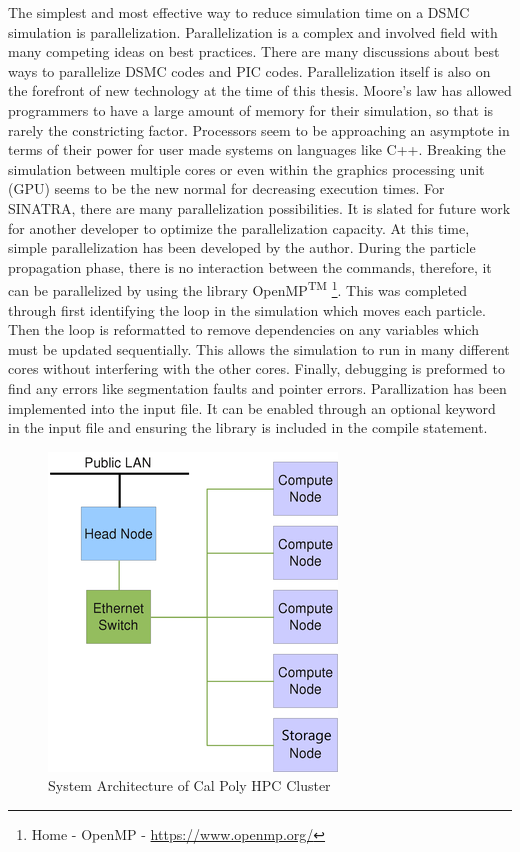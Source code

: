 \indent The simplest and most effective way to reduce simulation time on a DSMC simulation is parallelization. Parallelization is a complex and involved field with many competing ideas on best practices. There are many discussions about best ways to parallelize DSMC codes and PIC codes. Parallelization itself is also on the forefront of new technology at the time of this thesis. Moore's law has allowed programmers to have a large amount of memory for their simulation, so that is rarely the constricting factor. Processors seem to be approaching an asymptote in terms of their power for user made systems on languages like C++. Breaking the simulation between multiple cores or even within the graphics processing unit (GPU) seems to be the new normal for decreasing execution times. For SINATRA, there are many parallelization possibilities. It is slated for future work for another developer to optimize the parallelization capacity. At this time, simple parallelization has been developed by the author. During the particle propagation phase, there is no interaction between the commands, therefore, it can be parallelized by using the library OpenMP\textsuperscript{TM} \footnote{Home - OpenMP - \url{https://www.openmp.org/}}. This was completed through first identifying the loop in the simulation which moves each particle. Then the loop is reformatted to remove dependencies on any variables which must be updated sequentially. This allows the simulation to run in many different cores without interfering with the other cores. Finally, debugging is preformed to find any errors like segmentation faults and pointer errors. Parallization has been implemented into the input file. It can be enabled through an optional keyword in the input file and ensuring the library is included in the compile statement. \par


\begin{figure}
\includegraphics[width=.55\textwidth]{figures/HPC_cluster.png}
\centering
\caption[System Architecture of Cal Poly HPC Cluster]{System Architecture of Cal Poly HPC Cluster \cite{hpc}}
\label{fig:hpccluser}
\end{figure}


